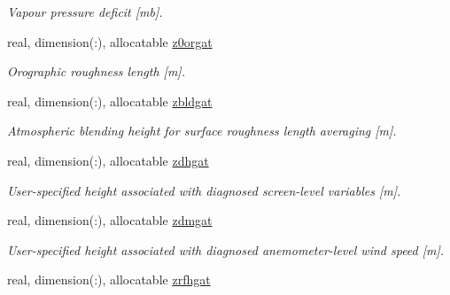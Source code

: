 \begin{DoxyCompactItemize}
\begin{DoxyCompactList}\small\item\em Vapour pressure deficit \mbox{[}mb\mbox{]}. \end{DoxyCompactList}\item 
\hypertarget{structclass__statevars_1_1class__gather_a594d0202794f011c9eaf44f6962bdef9}{}real, dimension(\+:), allocatable \hyperlink{structclass__statevars_1_1class__gather_a594d0202794f011c9eaf44f6962bdef9}{z0orgat}\label{structclass__statevars_1_1class__gather_a594d0202794f011c9eaf44f6962bdef9}

\begin{DoxyCompactList}\small\item\em Orographic roughness length \mbox{[}m\mbox{]}. \end{DoxyCompactList}\item 
\hypertarget{structclass__statevars_1_1class__gather_a02fce6091eb5c50b6760915e127c8294}{}real, dimension(\+:), allocatable \hyperlink{structclass__statevars_1_1class__gather_a02fce6091eb5c50b6760915e127c8294}{zbldgat}\label{structclass__statevars_1_1class__gather_a02fce6091eb5c50b6760915e127c8294}

\begin{DoxyCompactList}\small\item\em Atmospheric blending height for surface roughness length averaging \mbox{[}m\mbox{]}. \end{DoxyCompactList}\item 
\hypertarget{structclass__statevars_1_1class__gather_abebac911d283df3f6bca046161e2b323}{}real, dimension(\+:), allocatable \hyperlink{structclass__statevars_1_1class__gather_abebac911d283df3f6bca046161e2b323}{zdhgat}\label{structclass__statevars_1_1class__gather_abebac911d283df3f6bca046161e2b323}

\begin{DoxyCompactList}\small\item\em User-\/specified height associated with diagnosed screen-\/level variables \mbox{[}m\mbox{]}. \end{DoxyCompactList}\item 
\hypertarget{structclass__statevars_1_1class__gather_aedb383c7e524f5401c83f1a2df035027}{}real, dimension(\+:), allocatable \hyperlink{structclass__statevars_1_1class__gather_aedb383c7e524f5401c83f1a2df035027}{zdmgat}\label{structclass__statevars_1_1class__gather_aedb383c7e524f5401c83f1a2df035027}

\begin{DoxyCompactList}\small\item\em User-\/specified height associated with diagnosed anemometer-\/level wind speed \mbox{[}m\mbox{]}. \end{DoxyCompactList}\item 
\hypertarget{structclass__statevars_1_1class__gather_ab8a3784402e9092d63395fd293995263}{}real, dimension(\+:), allocatable \hyperlink{structclass__statevars_1_1class__gather_ab8a3784402e9092d63395fd293995263}{zrfhgat}\label{structclass__statevars_1_1class__gather_ab8a3784402e9092d63395fd293995263}


\end{DoxyCompactItemize}
